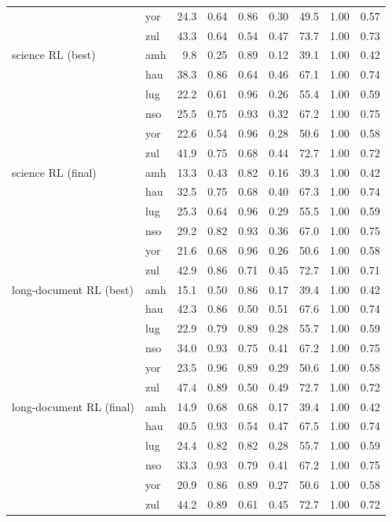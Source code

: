 {\begin{longtable}{@{}llrrrrrrr@{}}
 & yor & 24.3 & 0.64 & 0.86 & 0.30 & 49.5 & 1.00 & 0.57 \\
 & zul & 43.3 & 0.64 & 0.54 & 0.47 & 73.7 & 1.00 & 0.73 \\
\midrule
science RL (best) & amh & 9.8 & 0.25 & 0.89 & 0.12 & 39.1 & 1.00 & 0.42 \\
 & hau & 38.3 & 0.86 & 0.64 & 0.46 & 67.1 & 1.00 & 0.74 \\
 & lug & 22.2 & 0.61 & 0.96 & 0.26 & 55.4 & 1.00 & 0.59 \\
 & nso & 25.5 & 0.75 & 0.93 & 0.32 & 67.2 & 1.00 & 0.75 \\
 & yor & 22.6 & 0.54 & 0.96 & 0.28 & 50.6 & 1.00 & 0.58 \\
 & zul & 41.9 & 0.75 & 0.68 & 0.44 & 72.7 & 1.00 & 0.72 \\
\midrule
science RL (final) & amh & 13.3 & 0.43 & 0.82 & 0.16 & 39.3 & 1.00 & 0.42 \\
 & hau & 32.5 & 0.75 & 0.68 & 0.40 & 67.3 & 1.00 & 0.74 \\
 & lug & 25.3 & 0.64 & 0.96 & 0.29 & 55.5 & 1.00 & 0.59 \\
 & nso & 29.2 & 0.82 & 0.93 & 0.36 & 67.0 & 1.00 & 0.75 \\
 & yor & 21.6 & 0.68 & 0.96 & 0.26 & 50.6 & 1.00 & 0.58 \\
 & zul & 42.9 & 0.86 & 0.71 & 0.45 & 72.7 & 1.00 & 0.71 \\
\midrule
long-document RL (best) & amh & 15.1 & 0.50 & 0.86 & 0.17 & 39.4 & 1.00 & 0.42 \\
 & hau & 42.3 & 0.86 & 0.50 & 0.51 & 67.6 & 1.00 & 0.74 \\
 & lug & 22.9 & 0.79 & 0.89 & 0.28 & 55.7 & 1.00 & 0.59 \\
 & nso & 34.0 & 0.93 & 0.75 & 0.41 & 67.2 & 1.00 & 0.75 \\
 & yor & 23.5 & 0.96 & 0.89 & 0.29 & 50.6 & 1.00 & 0.58 \\
 & zul & 47.4 & 0.89 & 0.50 & 0.49 & 72.7 & 1.00 & 0.72 \\
\midrule
long-document RL (final) & amh & 14.9 & 0.68 & 0.68 & 0.17 & 39.4 & 1.00 & 0.42 \\
 & hau & 40.5 & 0.93 & 0.54 & 0.47 & 67.5 & 1.00 & 0.74 \\
 & lug & 24.4 & 0.82 & 0.82 & 0.28 & 55.7 & 1.00 & 0.59 \\
 & nso & 33.3 & 0.93 & 0.79 & 0.41 & 67.2 & 1.00 & 0.75 \\
 & yor & 20.9 & 0.86 & 0.89 & 0.27 & 50.6 & 1.00 & 0.58 \\
 & zul & 44.2 & 0.89 & 0.61 & 0.45 & 72.7 & 1.00 & 0.72 \\
\midrule
\end{longtable}}
